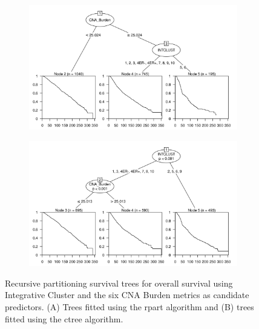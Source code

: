 \begin{figure}[!htb]
\centering

\vspace{0.5cm}

\begin{subfigure}{\textwidth}
\subcaption{}
\includegraphics[width=1\textwidth]{../figures/Appendices/Appendix_B/PartyKit_Survival_Burden_OS_INTCLUST.png}
\end{subfigure}

\vspace{2cm}

\begin{subfigure}{\textwidth}
\subcaption{}
\includegraphics[width=1\textwidth]{../figures/Appendices/Appendix_B/Ctree_Survival_Burden_OS_INTCLUST.png}
\end{subfigure}

\vspace{0.5cm}

\caption[Recursive partitioning survival trees for overall survival using Integrative Cluster and the six CNA Burden metrics as candidate predictors.]{Recursive partitioning survival trees for overall survival using Integrative Cluster and the six CNA Burden metrics as candidate predictors. (A) Trees fitted using the rpart algorithm and (B) trees fitted using the ctree algorithm.}
\end{figure}

